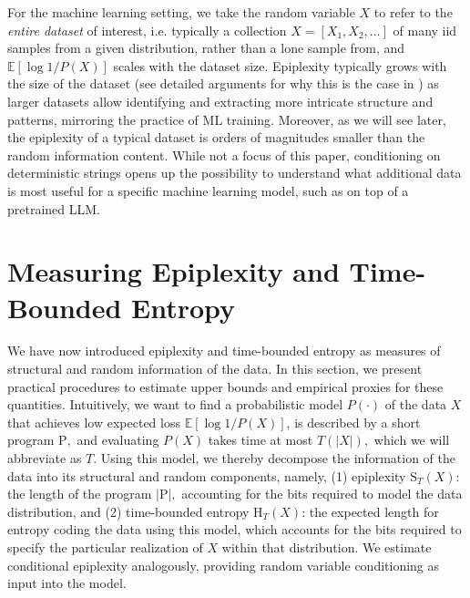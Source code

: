 \documentclass[twoside]{article}
\newcommand{\E}{\mathbb{E}}
\newcommand{\rH}{\mathrm{H}}
\newcommand{\rS}{\mathrm{S}}
\begin{document}
%
%
%
%
%
%
%
%
%
%
%
%
%
%
%
For the machine learning setting, we take the random variable $X$ to refer to the \emph{entire dataset} of interest, i.e. typically a collection $X=[X_1,X_2,\dots]$ of many iid samples from a given distribution, rather than a lone sample from, and $\E[\log 1/P(X)]$ scales with the dataset size.  %
%
%
Epiplexity typically grows with the size of the dataset (see detailed arguments for why this is the case in ) as larger datasets allow identifying and extracting more intricate structure and patterns, mirroring the practice of ML training. Moreover, as we will see later, the epiplexity of a typical dataset is orders of magnitudes smaller than the random information content. While not a focus of this paper, conditioning on deterministic strings opens up the possibility to understand what additional data is most useful for a specific machine learning model, such as on top of a pretrained LLM.

\section{Measuring Epiplexity and Time-Bounded Entropy}
\label{sec:measuring}
%

%

%

%
%

%
%

We have now introduced epiplexity and time-bounded entropy as measures of structural and random information of the data. In this section, we present practical procedures to estimate upper bounds and empirical proxies for these quantities. Intuitively, we want to find a probabilistic model $P(\cdot)$ of the data $X$ that achieves low expected loss $\E[\log 1/P(X)]$, is described by a short program $\mathrm{P},$ and evaluating $P(X)$ takes time at most $T(|X|),$ which we will abbreviate as $T.$ Using this model, we thereby decompose the information of the data into its structural and random components, namely, (1) epiplexity $\rS_T(X)$: the length of the program $|\mathrm{P}|,$ accounting for the bits required to model the data distribution, and (2) time-bounded entropy $\rH_T(X)$: the expected length for entropy coding the data using this model, which accounts for the bits required to specify the particular realization of $X$ within that distribution. We estimate conditional epiplexity analogously, providing random variable conditioning as input into the model. %
\end{document}
